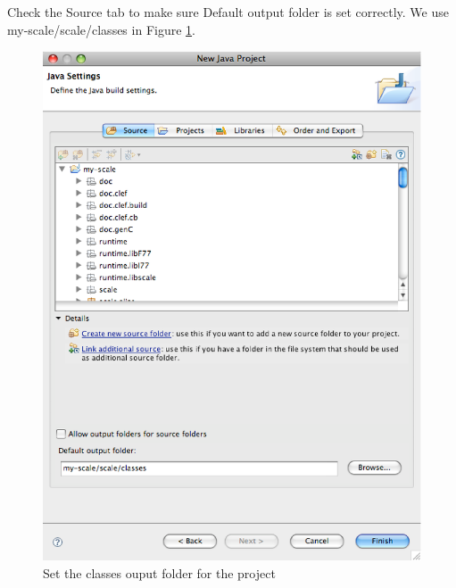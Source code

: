 \documentclass[12pt,twoside,letterpaper]{article}
\begin{document}
Check the Source tab to make sure Default output folder is set correctly. We use my-scale/scale/classes in Figure \ref{fig:create_java_project_source}.
\begin{figure}[htp]
\includegraphics[width=150mm]{create_java_project_source.eps}
\caption{Set the classes ouput folder for the project}\label{fig:create_java_project_source}
\end{figure}
\end{document}
